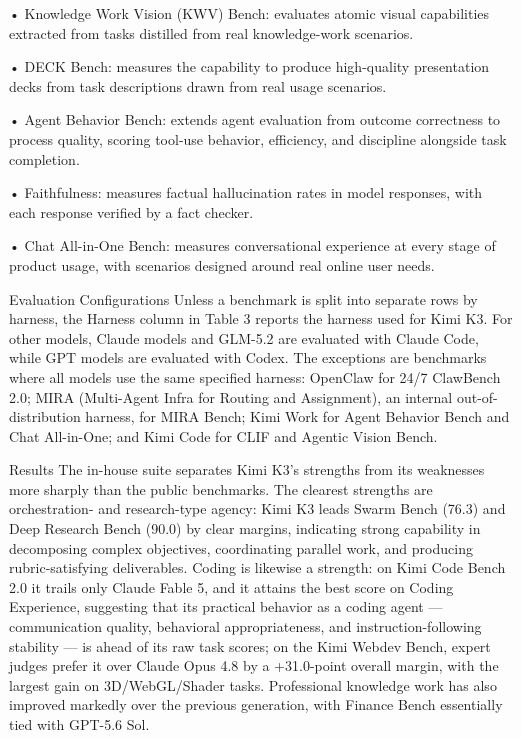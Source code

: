 \documentclass[
  10
]{article}
\begin{document}
• Knowledge Work Vision (KWV) Bench: evaluates atomic visual
capabilities extracted from tasks distilled from real knowledge-work
scenarios.

• DECK Bench: measures the capability to produce high-quality
presentation decks from task descriptions drawn from real usage
scenarios.

• Agent Behavior Bench: extends agent evaluation from outcome
correctness to process quality, scoring tool-use behavior, efficiency,
and discipline alongside task completion.

• Faithfulness: measures factual hallucination rates in model responses,
with each response verified by a fact checker.

• Chat All-in-One Bench: measures conversational experience at every
stage of product usage, with scenarios designed around real online user
needs.

Evaluation Configurations Unless a benchmark is split into separate rows
by harness, the Harness column in Table 3 reports the harness used for
Kimi K3. For other models, Claude models and GLM-5.2 are evaluated with
Claude Code, while GPT models are evaluated with Codex. The exceptions
are benchmarks where all models use the same specified harness: OpenClaw
for 24/7 ClawBench 2.0; MIRA (Multi-Agent Infra for Routing and
Assignment), an internal out-of-distribution harness, for MIRA Bench;
Kimi Work for Agent Behavior Bench and Chat All-in-One; and Kimi Code
for CLIF and Agentic Vision Bench.

Results The in-house suite separates Kimi K3's strengths from its
weaknesses more sharply than the public benchmarks. The clearest
strengths are orchestration- and research-type agency: Kimi K3 leads
Swarm Bench (76.3) and Deep Research Bench (90.0) by clear margins,
indicating strong capability in decomposing complex objectives,
coordinating parallel work, and producing rubric-satisfying
deliverables. Coding is likewise a strength: on Kimi Code Bench 2.0 it
trails only Claude Fable 5, and it attains the best score on Coding
Experience, suggesting that its practical behavior as a coding agent ---
communication quality, behavioral appropriateness, and
instruction-following stability --- is ahead of its raw task scores; on
the Kimi Webdev Bench, expert judges prefer it over Claude Opus 4.8 by a
+31.0-point overall margin, with the largest gain on 3D/WebGL/Shader
tasks. Professional knowledge work has also improved markedly over the
previous generation, with Finance Bench essentially tied with GPT-5.6
Sol.
\end{document}
